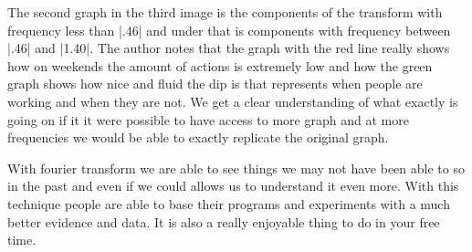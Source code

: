 \documentclass [../article.tex]{subfiles}
\begin{document}
  The second graph in the third image is the components of the
  transform with frequency less than |.46| and under that is
  components with frequency between |.46| and |1.40|.  The author
  notes that  the graph with the red line really shows how on
  weekends the amount of actions is extremely low and how the
  green graph shows how nice and fluid the dip is that represents
  when people are working and when they are not. We get a clear
  understanding of what exactly is going on if it it were possible
  to have access to more graph and at more frequencies we would be
  able to exactly replicate the original graph.

	With fourier transform we are able to see things we may not have
  been able to so in the past and even if we could allows us to
  understand it even more. With this technique people are able to
  base their programs and experiments with a much better evidence
  and data. It is also a really enjoyable thing to do in your free
  time.
\end{document}
